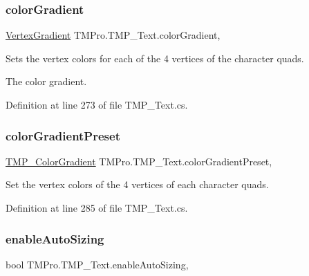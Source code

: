 \subsubsection{\texorpdfstring{colorGradient}{colorGradient}}
{\footnotesize\ttfamily \mbox{\hyperlink{struct_t_m_pro_1_1_vertex_gradient}{Vertex\+Gradient}} T\+M\+Pro.\+T\+M\+P\+\_\+\+Text.\+color\+Gradient\hspace{0.3cm}{\ttfamily [get]}, {\ttfamily [set]}}



Sets the vertex colors for each of the 4 vertices of the character quads. 

The color gradient.

Definition at line 273 of file T\+M\+P\+\_\+\+Text.\+cs.

\mbox{\label{class_t_m_pro_1_1_t_m_p___text_a7e5dc2c3fb4201a3a18df594f95be7eb}} 
\subsubsection{\texorpdfstring{colorGradientPreset}{colorGradientPreset}}
{\footnotesize\ttfamily \mbox{\hyperlink{class_t_m_pro_1_1_t_m_p___color_gradient}{T\+M\+P\+\_\+\+Color\+Gradient}} T\+M\+Pro.\+T\+M\+P\+\_\+\+Text.\+color\+Gradient\+Preset\hspace{0.3cm}{\ttfamily [get]}, {\ttfamily [set]}}



Set the vertex colors of the 4 vertices of each character quads. 



Definition at line 285 of file T\+M\+P\+\_\+\+Text.\+cs.

\mbox{\label{class_t_m_pro_1_1_t_m_p___text_a883dca142dadf370e7a49e1f4627e88f}} 
\subsubsection{\texorpdfstring{enableAutoSizing}{enableAutoSizing}}
{\footnotesize\ttfamily bool T\+M\+Pro.\+T\+M\+P\+\_\+\+Text.\+enable\+Auto\+Sizing\hspace{0.3cm}{\ttfamily [get]}, {\ttfamily [set]}}



